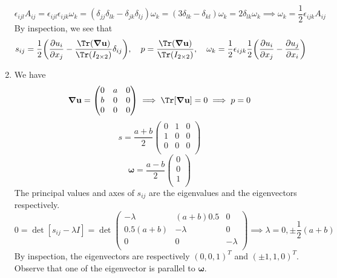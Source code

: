 \documentclass[a4paper]{article}
\begin{document}
\begin{ans}
\begin{enumerate}[label=(\roman*)]
$$\epsilon_{ijl}A_{ij}=\epsilon_{ijl}\epsilon_{ijk}\omega_k=(\delta_{jj}\delta_{lk}-\delta_{jk}\delta_{lj})\omega_k=(3\delta_{lk}-\delta_{kl})\omega_k=2\delta_{lk}\omega_k\implies\omega_k=\frac{1}{2}\epsilon_{ijk}A_{ij}$$
By inspection, we see that $$s_{ij}=\frac{1}{2}\bigg(\frac{\partial u_i}{\partial x_j}-\frac{\Tr(\boldsymbol{\nabla}\mathbf{u})}{\Tr(I_{2\times 2})}\delta_{ij}\bigg),\quad p=\frac{\Tr(\boldsymbol{\nabla}\mathbf{u})}{\Tr(I_{2\times 2})},\quad \omega_k=\frac{1}{2}\epsilon_{ijk}\frac{1}{2}\bigg(\frac{\partial u_i}{\partial x_j}-\frac{\partial u_j}{\partial x_i}\bigg)$$
\item We have
$$\boldsymbol{\nabla}\mathbf{u}=\begin{pmatrix}0&a&0\\b&0&0\\0&0&0\\\end{pmatrix}\implies\Tr[\boldsymbol{\nabla}\mathbf{u}]=0\implies p=0$$
$$s=\frac{a+b}{2}\begin{pmatrix}0&1&0\\1&0&0\\0&0&0\\\end{pmatrix}$$
$$\boldsymbol{\omega}=\frac{a-b}{2}\begin{pmatrix}0\\0\\1\\\end{pmatrix}$$
The principal values and axes of $s_{ij}$ are the eigenvalues and the eigenvectors respectively.
$$0=\det[s_{ij}-\lambda I]=\det\begin{pmatrix}-\lambda&(a+b)0.5&0\\0.5(a+b)&-\lambda&0\\0&0&-\lambda\\\end{pmatrix}\implies\lambda=0,\pm\frac{1}{2}(a+b)$$
By inspection, the eigenvectors are respectively $(0,0,1)^T$ and $(\pm1,1,0)^T$. Observe that one of the eigenvector is parallel to $\boldsymbol{\omega}$.
\end{enumerate}
\end{ans}
\newpage
\end{document}
